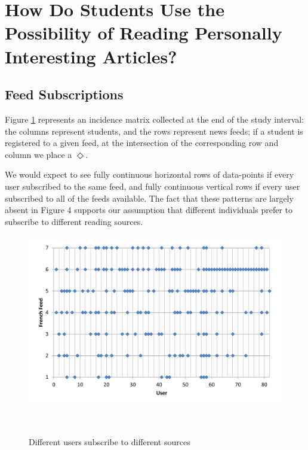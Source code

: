 
\newpage
\section{How Do Students Use the Possibility of Reading Personally Interesting Articles?}
\label{sec:results}

\subsection {Feed Subscriptions}
Figure \ref{fig:registrations} represents an incidence matrix collected at the end of the study interval: the columns represent students, and the rows represent news feeds; if a student is registered to a given feed, at the intersection of the corresponding row and column we place a $\Diamond$. 

We would expect to see fully continuous horizontal rows of data-points if every user subscribed to the same feed, and fully continuous vertical rows if every user subscribed to all of the feeds available. The fact that these patterns are largely absent in Figure 4 supports our assumption that different individuals prefer to subscribe to different reading sources.


\begin{figure}[h!]
\centering
  \includegraphics[width=\columnwidth]{figures/users_feeds}
  \caption{Different users subscribe to different sources}~\label{fig:registrations}
\end{figure}

